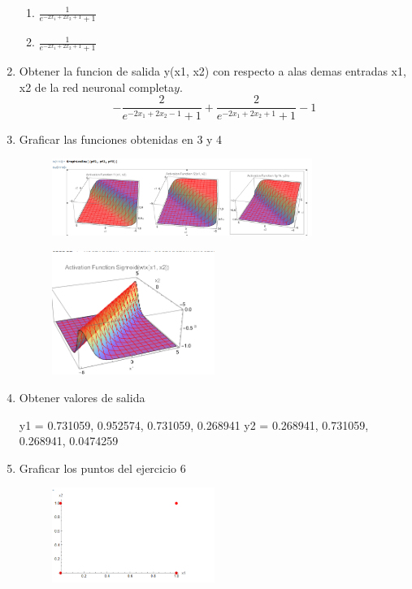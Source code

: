 \documentclass{article}
\begin{document}
\begin{flushleft}
\begin{enumerate}
\begin{enumerate}
    \item \(\frac{1}{e^{-2x_1 + 2x_2 + 1} + 1}\)
    

    \item \(\frac{1}{e^{-2x_1 + 2x_2 + 1} + 1}\)

  \end{enumerate}

  \item Obtener la funcion de salida y(x1, x2) con respecto a alas demas entradas x1, x2 de la red neuronal completa$y$.
  \[
  -\frac{2}{e^{-2x_1+2x_2-1}+1} + \frac{2}{e^{-2x_1+2x_2+1}+1} - 1
  \]
 
  \item Graficar las funciones obtenidas en 3 y 4
  \begin{figure}[H]
    \centering
    \includegraphics[width=0.8\textwidth]{4_e.PNG}  %
  \end{figure}
  \begin{figure}[H]
    \centering
    \includegraphics[width=0.5\textwidth]{4_e_2.PNG}  %
  \end{figure}

  \item Obtener valores de salida
  
  y1 = 0.731059, 0.952574, 0.731059, 0.268941
  y2 = 0.268941, 0.731059, 0.268941, 0.0474259

  \item Graficar los puntos del ejercicio 6
  \begin{figure}[H]
    \centering
    \includegraphics[width=0.5\textwidth]{4_g.PNG}  %
  \end{figure}


\end{enumerate}
\end{flushleft}
\end{document}
